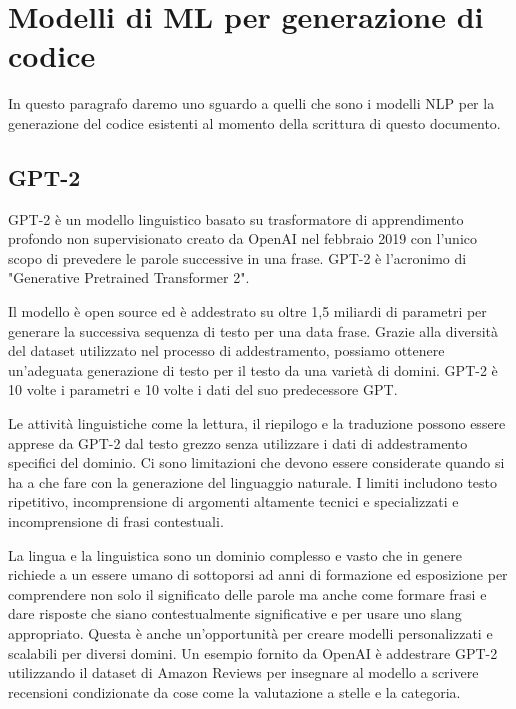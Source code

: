 \section{Modelli di ML per generazione di codice}
In questo paragrafo daremo uno sguardo a quelli che sono i modelli NLP per la generazione del codice esistenti al momento della scrittura di questo documento.
\subsection{GPT-2}
GPT-2 è un modello linguistico basato su trasformatore di apprendimento profondo non supervisionato creato da OpenAI nel febbraio 2019 con l'unico scopo di prevedere le parole successive in una frase. GPT-2 è l'acronimo di "Generative Pretrained Transformer 2". 

Il modello è open source ed è addestrato su oltre 1,5 miliardi di parametri per generare la successiva sequenza di testo per una data frase. Grazie alla diversità del dataset utilizzato nel processo di addestramento, possiamo ottenere un'adeguata generazione di testo per il testo da una varietà di domini. GPT-2 è 10 volte i parametri e 10 volte i dati del suo predecessore GPT.

Le attività linguistiche come la lettura, il riepilogo e la traduzione possono essere apprese da GPT-2 dal testo grezzo senza utilizzare i dati di addestramento specifici del dominio.
Ci sono limitazioni che devono essere considerate quando si ha a che fare con la generazione del linguaggio naturale. I limiti includono testo ripetitivo, incomprensione di argomenti altamente tecnici e specializzati e incomprensione di frasi contestuali.

La lingua e la linguistica sono un dominio complesso e vasto che in genere richiede a un essere umano di sottoporsi ad anni di formazione ed esposizione per comprendere non solo il significato delle parole ma anche come formare frasi e dare risposte che siano contestualmente significative e per usare uno slang appropriato. Questa è anche un'opportunità per creare modelli personalizzati e scalabili per diversi domini. Un esempio fornito da OpenAI è addestrare GPT-2 utilizzando il dataset di Amazon Reviews per insegnare al modello a scrivere recensioni condizionate da cose come la valutazione a stelle e la categoria.

